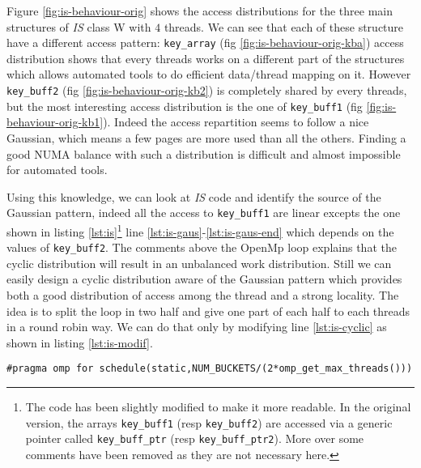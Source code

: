 Figure \ref{fig:is-behaviour-orig} shows the access distributions for the
three main structures of \emph{IS} class W with $4$ threads. We can see that
each of these structure have a different access pattern: \texttt{key\_array}
(fig \ref{fig:is-behaviour-orig-kba}) access distribution shows that every
threads works on a different part of the structures which allows automated
tools to do efficient data/thread mapping on it. However \texttt{key\_buff2}
(fig \ref{fig:is-behaviour-orig-kb2}) is completely shared by every threads,
but the most interesting access distribution is the one of \texttt{key\_buff1}
(fig \ref{fig:is-behaviour-orig-kb1}). Indeed the access repartition seems to
follow a nice Gaussian, which means a few pages are more used than all the
others. Finding a good NUMA balance with such a distribution is difficult and
almost impossible for automated tools.




Using this knowledge, we can look at \emph{IS} code and identify the source of the
Gaussian pattern, indeed all the access to \texttt{key\_buff1} are linear
excepts the one shown in listing \ref{lst:is}\footnote{
    The code has been slightly modified to make it more readable. In the
    original version, the arrays \texttt{key\_buff1} (resp \texttt{key\_buff2})
    are accessed via a generic pointer called \texttt{key\_buff\_ptr} (resp
    \texttt{key\_buff\_ptr2}). More over some comments have been removed as
    they are not necessary here.
}  line \ref{lst:is-gaus}-\ref{lst:is-gaus-end} which depends on the values of
\texttt{key\_buff2}. The comments above the OpenMp loop explains that the
cyclic distribution will result in an unbalanced work distribution. Still we can easily design a cyclic
distribution aware of the Gaussian pattern which provides both a good
distribution of access among the thread and a strong locality. The idea is to
split the loop in two half and give one part of each half to each threads in a
round robin way. We can do that only by modifying line \ref{lst:is-cyclic} as
shown in listing \ref{lst:is-modif}.
\begin{lstlisting}[caption=One line optimization for \emph{IS}, label=lst:is-modif]
#pragma omp for schedule(static,NUM_BUCKETS/(2*omp_get_max_threads()))
\end{lstlisting}

